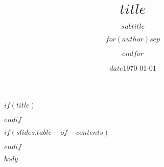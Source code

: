 \documentclass[aspectratio=$if(slides.aspect-ratio)$$slides.aspect-ratio$$else$169$endif$,$if(slides.font-size)$$slides.font-size$$else$10pt$endif$]{beamer}
\title{$title$}
\subtitle{$subtitle$}
\date{$date$}
\date{\today}
\author{$for(author)$\colorhref{mailto:$author.email$}{$author.name$}$sep$ \and $endfor$}
\institute{$institute$}
\begin{document}
$if(title)$
\begin{frame}
    \titlepage
\end{frame}
$endif$

$if(slides.table-of-contents)$
\begin{frame}
    \tableofcontents
\end{frame}
$endif$

$body$
\end{document}
